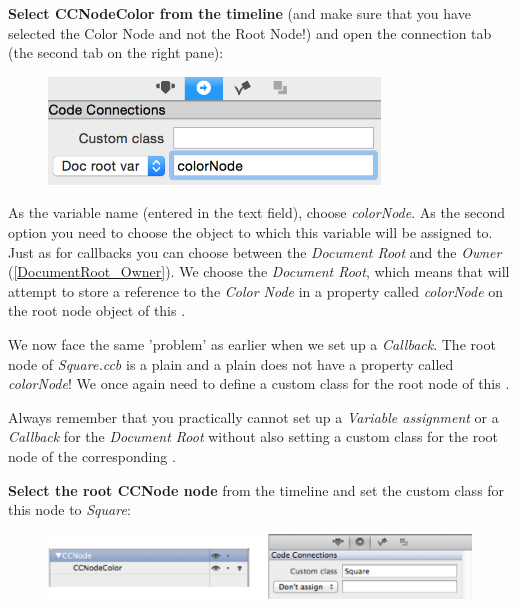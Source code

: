 \begin{leftbar}
\textbf{Select CCNodeColor from the timeline} (and make sure that you
have selected the Color Node and not the Root Node!) and open the connection tab
(the second tab on the right pane):
\begin{figure}[H]
		\centering
		\includegraphics[width=250pt]{images/Chapter1/square_code_connection.png}
\end{figure}
As the variable name (entered in the text field), choose \textit{colorNode}.
As the second option you need to choose the object to which this variable will be
assigned to. Just as for callbacks you can choose between the \textit{Document
Root} and the \textit{Owner} (\ref{DocumentRoot_Owner}). We choose the
\textit{Document Root}, which means that \SB{} will attempt to store a reference
to the \textit{Color Node} in a property called \textit{colorNode}
 on the root node object of this \ccbfile{}.
\end{leftbar}

We now face the same 'problem' as earlier when we set up a
\textit{Callback}. The root node of \textit{Square.ccb} is a plain \ccnode{} and
a plain \ccnode{} does not have a property called
\textit{colorNode}! We once again need to define a custom class for the root
node of this \ccbfile{}.

\begin{details} 
Always remember that you practically cannot set up a \textit{Variable
assignment} or a \textit{Callback} for the \textit{Document Root} without also
setting a custom class for the root node of the corresponding \ccbfile{}.
\end{details}

\begin{leftbar}
\textbf{Select the root CCNode node} from the timeline and set the custom class
for this node to \textit{Square}:
\begin{figure}[H]
		\centering
		\includegraphics[width=350pt]{images/firstproject/square_custom_class.png}
\end{figure}
\end{leftbar}

